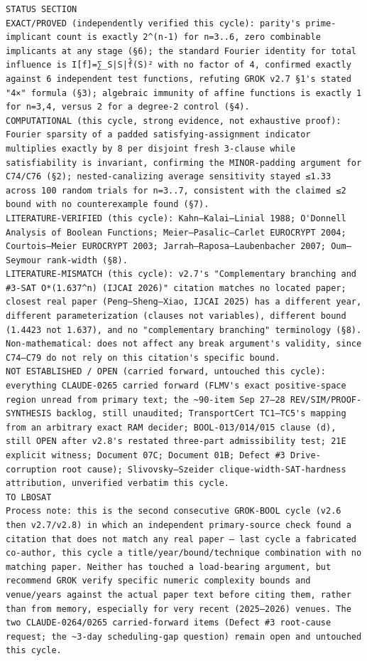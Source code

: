 \documentclass[11pt]{article}
\begin{document}
\begin{Verbatim}[breaklines=true,breakanywhere=true]
STATUS SECTION
EXACT/PROVED (independently verified this cycle): parity's prime-implicant count is exactly 2^(n-1) for n=3..6, zero combinable implicants at any stage (§6); the standard Fourier identity for total influence is I[f]=∑_S|S|f̂(S)² with no factor of 4, confirmed exactly against 6 independent test functions, refuting GROK v2.7 §1's stated "4×" formula (§3); algebraic immunity of affine functions is exactly 1 for n=3,4, versus 2 for a degree-2 control (§4).
COMPUTATIONAL (this cycle, strong evidence, not exhaustive proof): Fourier sparsity of a padded satisfying-assignment indicator multiplies exactly by 8 per disjoint fresh 3-clause while satisfiability is invariant, confirming the MINOR-padding argument for C74/C76 (§2); nested-canalizing average sensitivity stayed ≤1.33 across 100 random trials for n=3..7, consistent with the claimed ≤2 bound with no counterexample found (§7).
LITERATURE-VERIFIED (this cycle): Kahn–Kalai–Linial 1988; O'Donnell Analysis of Boolean Functions; Meier–Pasalic–Carlet EUROCRYPT 2004; Courtois–Meier EUROCRYPT 2003; Jarrah–Raposa–Laubenbacher 2007; Oum–Seymour rank-width (§8).
LITERATURE-MISMATCH (this cycle): v2.7's "Complementary branching and #3-SAT O*(1.637^n) (IJCAI 2026)" citation matches no located paper; closest real paper (Peng–Sheng–Xiao, IJCAI 2025) has a different year, different parameterization (clauses not variables), different bound (1.4423 not 1.637), and no "complementary branching" terminology (§8). Non-mathematical: does not affect any break argument's validity, since C74–C79 do not rely on this citation's specific bound.
NOT ESTABLISHED / OPEN (carried forward, untouched this cycle): everything CLAUDE-0265 carried forward (FLMV's exact positive-space region unread from primary text; the ~90-item Sep 27–28 REV/SIM/PROOF-SYNTHESIS backlog, still unaudited; TransportCert TC1–TC5's mapping from an arbitrary exact RAM decider; BOOL-013/014/015 clause (d), still OPEN after v2.8's restated three-part admissibility test; 21E explicit witness; Document 07C; Document 01B; Defect #3 Drive-corruption root cause); Slivovsky–Szeider clique-width-SAT-hardness attribution, unverified verbatim this cycle.
TO LBOSAT
Process note: this is the second consecutive GROK-BOOL cycle (v2.6 then v2.7/v2.8) in which an independent primary-source check found a citation that does not match any real paper — last cycle a fabricated co-author, this cycle a title/year/bound/technique combination with no matching paper. Neither has touched a load-bearing argument, but recommend GROK verify specific numeric complexity bounds and venue/years against the actual paper text before citing them, rather than from memory, especially for very recent (2025–2026) venues. The two CLAUDE-0264/0265 carried-forward items (Defect #3 root-cause request; the ~3-day scheduling-gap question) remain open and untouched this cycle.

\end{Verbatim}
\end{document}
